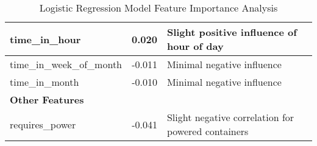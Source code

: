 \begin{table}[htbp]
\begin{tabular}{|l|r|p{7cm}|}
				\hline
				time\_in\_hour & 0.020 & Slight positive influence of hour of day
				\\
				\hline
				time\_in\_week\_of\_month & -0.011 & Minimal negative influence
				\\
				\hline
				time\_in\_month & -0.010 & Minimal negative influence
				\\
				\hline
				\multicolumn{3}{|l|}{\textbf{Other Features}} \\
				\hline
				requires\_power & -0.041 & Slight negative correlation for powered
				containers
				\\
				\hline
			\end{tabular}
			\caption{Logistic Regression Model Feature Importance Analysis}
			\label{tab:feature_importance_logistic_regression}
		\end{table}